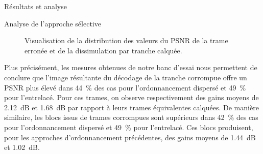 \documentclass[letterpaper, twoside, 12pt,memoire]{thETS}
\begin{document}
\begin{chapter}{Résultats et analyse}
\begin{section}{Analyse de l'approche sélective}
\begin{figure}[htb]
\caption{Visualisation de la distribution des valeurs du PSNR de la trame
erronée et de la dissimulation par tranche calquée.}
\label{fig-ScVsErroneous}
\end{figure}

Plus précisément, les mesures obtenues de notre banc d'essai nous permettent de
conclure que l'image résultante du décodage de la tranche corrompue offre un
PSNR plus élevé dans 44~\% des cas pour l'ordonnancement dispersé et 49~\% pour
l'entrelacé. Pour ces trames, on observe respectivement des gains moyens de
2.12~dB et 1.68~dB par rapport à leurs trames équivalentes calquées. De manière
similaire, les blocs issus de trames corrompues sont supérieurs dans 42~\% des
cas pour l'ordonnancement dispersé et 49~\% pour l'entrelacé. Ces blocs
produisent, pour les approches d'ordonnancement précédentes, des gains moyens de
1.44~dB et 1.02~dB.


\end{section}
\end{chapter}
\end{document}
